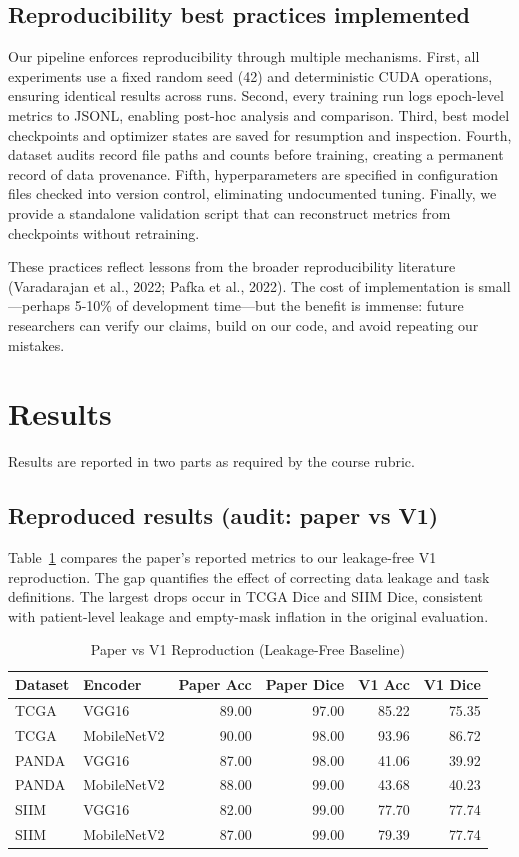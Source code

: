 \documentclass[conference,a4paper]{IEEEtran}
\begin{document}
\subsection{Reproducibility best practices implemented}
Our pipeline enforces reproducibility through multiple mechanisms. First, all experiments use a fixed random seed (42) and deterministic CUDA operations, ensuring identical results across runs. Second, every training run logs epoch-level metrics to JSONL, enabling post-hoc analysis and comparison. Third, best model checkpoints and optimizer states are saved for resumption and inspection. Fourth, dataset audits record file paths and counts before training, creating a permanent record of data provenance. Fifth, hyperparameters are specified in configuration files checked into version control, eliminating undocumented tuning. Finally, we provide a standalone validation script that can reconstruct metrics from checkpoints without retraining.

These practices reflect lessons from the broader reproducibility literature (Varadarajan et al., 2022; Pafka et al., 2022). The cost of implementation is small—perhaps 5-10\% of development time—but the benefit is immense: future researchers can verify our claims, build on our code, and avoid repeating our mistakes.

\FloatBarrier

\section{Results}
Results are reported in two parts as required by the course rubric.

\subsection{Reproduced results (audit: paper vs V1)}
Table~\ref{tab:audit} compares the paper's reported metrics to our leakage-free V1 reproduction. The gap quantifies the effect of correcting data leakage and task definitions. The largest drops occur in TCGA Dice and SIIM Dice, consistent with patient-level leakage and empty-mask inflation in the original evaluation.

\begin{table}[t]
\centering
\caption{Paper vs V1 Reproduction (Leakage-Free Baseline)}
\label{tab:audit}
\begin{tabular}{l l r r r r}
\toprule
Dataset & Encoder & Paper Acc & Paper Dice & V1 Acc & V1 Dice \\
\midrule
TCGA & VGG16 & 89.00 & 97.00 & 85.22 & 75.35 \\
TCGA & MobileNetV2 & 90.00 & 98.00 & 93.96 & 86.72 \\
PANDA & VGG16 & 87.00 & 98.00 & 41.06 & 39.92 \\
PANDA & MobileNetV2 & 88.00 & 99.00 & 43.68 & 40.23 \\
SIIM & VGG16 & 82.00 & 99.00 & 77.70 & 77.74 \\
SIIM & MobileNetV2 & 87.00 & 99.00 & 79.39 & 77.74 \\
\bottomrule
\end{tabular}
\end{table}
\end{document}
